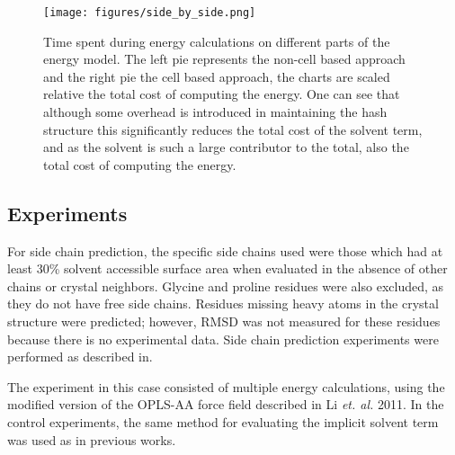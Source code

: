 \begin{figure}[h]
\begin{center}
\texttt{[image: figures/side\_by\_side.png]}
\caption{Time spent during energy calculations on different parts of the energy model.
The left pie represents the non-cell based approach and the right pie the cell based approach, the charts are scaled relative the total cost of computing the energy.
One can see that although some overhead is introduced in maintaining the hash structure this significantly reduces the total cost of the solvent term, and as the solvent is such a large contributor to the total, also the total cost of computing the energy.}
\label{fig:timing_pie}
\end{center}
\end{figure}

\subsection*{Experiments}
\label{subsec:experiments}
For side chain prediction, the specific side chains used were those which had at least 30\% solvent accessible surface area when evaluated in the absence of other chains or crystal neighbors.
Glycine and proline residues were also excluded, as they do not have free side chains.
Residues missing heavy atoms in the crystal structure were predicted; however, RMSD was not measured for these residues because there is no experimental data.
Side chain prediction experiments were performed as described in\cite{jacobson2002role}.

The experiment in this case consisted of multiple energy calculations, using the modified version of the OPLS-AA force field described in Li {\it et. al.} 2011\cite{li2011vsgb}.
In the control experiments, the same method for evaluating the implicit solvent term was used as in previous works.


